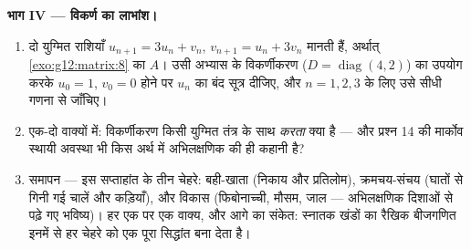 \begin{problem}
\medskip
\noindent\textbf{भाग IV --- विकर्ण का लाभांश।}
\begin{enumerate}[resume]
  \item दो युग्मित राशियाँ $u_{n+1} = 3u_n + v_n$, $v_{n+1} = u_n + 3v_n$ मानती हैं, अर्थात् \cref{exo:g12:matrix:8} का 
        $A$। उसी अभ्यास के विकर्णीकरण ($D = \operatorname{diag}(4, 2)$) का उपयोग करके $u_0 = 1$, $v_0 = 0$
        होने पर $u_n$ का बंद सूत्र दीजिए, और $n = 1, 2, 3$ के लिए उसे सीधी गणना से
        जाँचिए।
  \item एक-दो वाक्यों में: विकर्णीकरण किसी युग्मित तंत्र के साथ \emph{करता}
        क्या है --- और प्रश्न 14 की मार्कोव स्थायी अवस्था भी किस अर्थ में
        अभिलक्षणिक  की ही कहानी है?
  \item समापन --- इस सप्ताहांत  के तीन चेहरे: बही-खाता (निकाय और
        प्रतिलोम), क्रमचय-संचय (घातों से गिनी गई चालें और कड़ियाँ), और विकास
        (फिबोनाच्ची, मौसम, जाल --- अभिलक्षणिक दिशाओं से पढ़े गए भविष्य)। हर
        एक पर एक वाक्य, और आगे का संकेत: स्नातक खंडों का रैखिक बीजगणित इनमें
        से हर चेहरे को एक पूरा सिद्धांत बना देता है।
\end{enumerate}
\end{problem}
